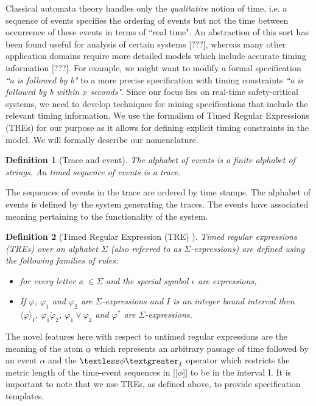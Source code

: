 \documentclass[]{sigplanconf}
\begin{document}
Classical automata theory handles only the \emph{qualitative} notion of time, i.e. a sequence of events specifies the ordering of events but not the time between occurrence of these events in terms of ``real time". An abstraction of this sort has been found useful for analysis of certain systems [???], whereas many other application domains require more detailed models which include accurate timing information [???]. For example, we might want to modify a formal specification \emph{``a is followed by b"} to a more precise specification with timing constraints \emph{``a is followed by b within $x$ seconds"}. Since our focus lies on real-time safety-critical systems, we need to develop techniques for mining specifications that include the relevant timing information. We use the formalism of Timed Regular Expressions (TREs) for our purpose as it allows for defining explicit timing constraints in the model. We will formally describe our nomenclature.

\newtheorem{defns}{Definition}

\begin{defns}[Trace and event]
The alphabet of events is a finite alphabet of strings. An timed sequence of events is a trace.
\end{defns}

The sequences of events in the trace are ordered by time stamps.
The alphabet of events is defined by the system generating the traces. The events have associated meaning pertaining to the functionality of the system.


\begin{defns}[Timed Regular Expression (TRE) \cite{timedregex}]
Timed regular expressions (TREs) over an alphabet $\Sigma$ (also referred to as $\Sigma$-expressions) are defined using the following families of rules:
\begin{itemize}
  \item  {} for every letter a $\in \Sigma$ and the special symbol $\epsilon$ are expressions,
  \item If $\varphi$, $\varphi_1$ and $\varphi_2$ are $\Sigma$-expressions and $I$ is an integer bound interval then $\langle \varphi \rangle_I$, $\varphi_1 \dot \varphi_2$, $\varphi_1 \vee \varphi_2$ and $\varphi^*$ are $\Sigma$-expressions.
\end{itemize}
\end{defns}

The novel features here with respect to untimed regular expressions are the meaning of the atom $\underline{\alpha}$ which represents an arbitrary passage of time followed by an event $\alpha$ and the $\textless \phi \textgreater _I$ operator which restricts the metric length of the time-event sequences in [[$\phi$]] to be in the interval I. It is important to note that we use TREs, as defined above, to provide specification templates.
\end{document}
